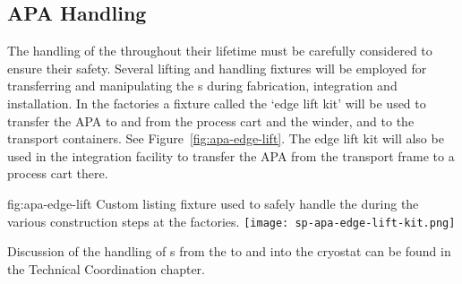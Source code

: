 

\subsection{APA Handling}
\label{sec:fdsp-apa-transport-handling}


The handling of the  throughout their lifetime must be carefully considered to ensure their safety.  Several lifting and handling fixtures will be employed for transferring and manipulating the s during fabrication, integration and installation.  In the factories a fixture called the `edge lift kit' will be used to transfer the APA to and from the process cart and the winder, and to the transport containers.  See Figure~\ref{fig:apa-edge-lift}.  The edge lift kit will also be used in the integration facility to transfer the APA from the transport frame to a process cart there.  

\begin{dunefigure}{fig:apa-edge-lift}
{Custom listing fixture used to safely handle the  during the various construction steps at the factories.}  
\texttt{[image: sp-apa-edge-lift-kit.png]} 
\end{dunefigure}

Discussion of the handling of s from the  to \surf and into the cryostat can be found in the Technical Coordination chapter. 



